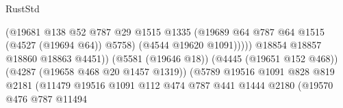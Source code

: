 \begin{lexlean}{RustStd}
\begin{coremodule}
                                                          (@19681
                                                            @138
                                                            @52
                                                            @787
                                                            @29
                                                            @1515
                                                            @1335
                                                            (@19689
                                                              @64
                                                              @787
                                                              @64
                                                              @1515
                                                              (@4527 (@19694 @64))
                                                              @5758)
                                                            (@4544 @19620 @1091)))))
                                                    @18854
                                                    @18857
                                                    @18860
                                                    @18863
                                                    @4451))
                                                (@5581 (@19646 @18))
                                                (@4445 (@19651 @152 @468))
                                                (@4287 (@19658 @468 @20 @1457 @1319))
                                                (@5789
                                                  @19516
                                                  @1091
                                                  @828
                                                  @819
                                                  @2181
                                                  (@11479
                                                    @19516
                                                    @1091
                                                    @112
                                                    @474
                                                    @787
                                                    @441
                                                    @1444
                                                    @2180
                                                    (@19570
                                                      @476
                                                      @787
                                                      @11494

\end{coremodule}
\end{lexlean}
